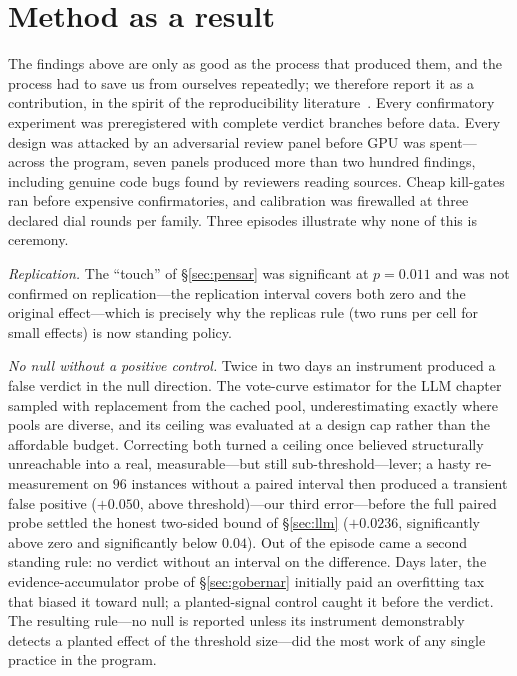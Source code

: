 \documentclass{article}
\begin{document}
\section{Method as a result}\label{sec:method}

The findings above are only as good as the process that produced them, and
the process had to save us from ourselves repeatedly; we therefore report it
as a contribution, in the spirit of the reproducibility
literature~\citep{nosek2018prereg,ioannidis2005why,simmons2011false}. Every
confirmatory experiment was
preregistered with complete verdict branches before data. Every design was
attacked by an adversarial review panel before GPU was spent---across the
program, seven panels produced more than two hundred findings, including genuine
code bugs found by reviewers reading sources. Cheap kill-gates ran before
expensive confirmatories, and calibration was firewalled at three declared
dial rounds per family. Three episodes illustrate why none of this is
ceremony.

\emph{Replication.} The ``touch'' of \S\ref{sec:pensar} was significant at
$p=0.011$ and was not confirmed on replication---the replication interval
covers both zero and the original effect---which is precisely why the
replicas rule (two runs per cell for small effects) is now standing
policy.

\emph{No null without a positive control.} Twice in two days an instrument
produced a false verdict in the null direction. The vote-curve estimator for
the LLM chapter sampled with replacement from the cached pool,
underestimating exactly where pools are diverse, and its ceiling was
evaluated at a design cap rather than the affordable budget. Correcting both
turned a ceiling once believed structurally unreachable into a real,
measurable---but still sub-threshold---lever; a hasty re-measurement on $96$ instances without a paired
interval then produced a transient false positive ($+0.050$, above
threshold)---our third error---before the full paired probe settled the
honest two-sided bound of \S\ref{sec:llm} ($+0.0236$, significantly above
zero and significantly below $0.04$). Out of the episode came a second
standing rule: no verdict without an interval on the difference. Days
later, the evidence-accumulator probe of
\S\ref{sec:gobernar} initially paid an overfitting tax that biased it
toward null; a planted-signal control caught it before the verdict. The
resulting rule---no null is reported unless its instrument demonstrably
detects a planted effect of the threshold size---did the most work of any
single practice in the program.
\end{document}
